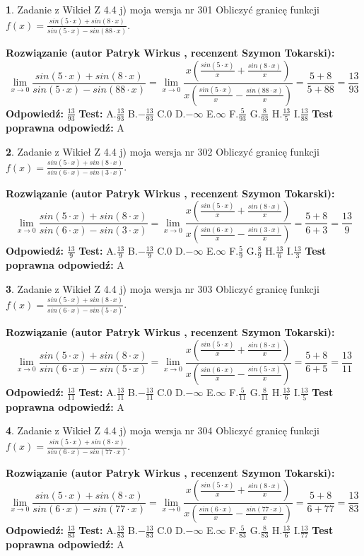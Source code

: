 \documentclass[12pt, a4paper]{article}
\theoremstyle{definition} %
\newtheorem{zad}{}
\newcommand{\zadStart}[1]{\begin{zad}#1\newline}
\newcommand{\zadStop}{\end{zad}}
\newcommand{\rozwStart}[2]{\noindent \textbf{Rozwiązanie (autor #1 , recenzent #2): }\newline}
\newcommand{\rozwStop}{\newline}
\newcommand{\odpStart}{\noindent \textbf{Odpowiedź:}\newline}
\newcommand{\odpStop}{\newline}
\newcommand{\testStart}{\noindent \textbf{Test:}\newline}
\newcommand{\testStop}{\newline}
\newcommand{\kluczStart}{\noindent \textbf{Test poprawna odpowiedź:}\newline}
\newcommand{\kluczStop}{\newline}
\begin{document}
\zadStart{Zadanie z Wikieł Z 4.4 j) moja wersja nr 301}
Obliczyć granicę funkcji $f(x)=\frac{sin(5\cdot x) +sin(8\cdot x)}{sin(5\cdot x) -sin(88\cdot x)}$.
\zadStop
\rozwStart{Patryk Wirkus}{Szymon Tokarski}
$$\lim\limits_{x\to 0}\frac{sin(5\cdot x) +sin(8\cdot x)}{sin(5\cdot x) -sin(88\cdot x)}=\lim\limits_{x\to 0}\frac{x(\frac{sin(5\cdot x)}{x}+\frac{sin(8\cdot x)}{x})}{x(\frac{sin(5\cdot x)}{x}-\frac{sin(88\cdot x)}{x})}=\frac{5+8}{5+88} = \frac{13}{93}$$
\rozwStop
\odpStart
$\frac{13}{93}$
\odpStop
\testStart
A.$\frac{13}{93}$
B.$-\frac{13}{93}$
C.$0$
D.$-\infty$
E.$\infty$
F.$\frac{5}{93}$
G.$\frac{8}{93}$
H.$\frac{13}{5}$
I.$\frac{13}{88}$
\testStop
\kluczStart
A
\kluczStop



\zadStart{Zadanie z Wikieł Z 4.4 j) moja wersja nr 302}
Obliczyć granicę funkcji $f(x)=\frac{sin(5\cdot x) +sin(8\cdot x)}{sin(6\cdot x) -sin(3\cdot x)}$.
\zadStop
\rozwStart{Patryk Wirkus}{Szymon Tokarski}
$$\lim\limits_{x\to 0}\frac{sin(5\cdot x) +sin(8\cdot x)}{sin(6\cdot x) -sin(3\cdot x)}=\lim\limits_{x\to 0}\frac{x(\frac{sin(5\cdot x)}{x}+\frac{sin(8\cdot x)}{x})}{x(\frac{sin(6\cdot x)}{x}-\frac{sin(3\cdot x)}{x})}=\frac{5+8}{6+3} = \frac{13}{9}$$
\rozwStop
\odpStart
$\frac{13}{9}$
\odpStop
\testStart
A.$\frac{13}{9}$
B.$-\frac{13}{9}$
C.$0$
D.$-\infty$
E.$\infty$
F.$\frac{5}{9}$
G.$\frac{8}{9}$
H.$\frac{13}{6}$
I.$\frac{13}{3}$
\testStop
\kluczStart
A
\kluczStop



\zadStart{Zadanie z Wikieł Z 4.4 j) moja wersja nr 303}
Obliczyć granicę funkcji $f(x)=\frac{sin(5\cdot x) +sin(8\cdot x)}{sin(6\cdot x) -sin(5\cdot x)}$.
\zadStop
\rozwStart{Patryk Wirkus}{Szymon Tokarski}
$$\lim\limits_{x\to 0}\frac{sin(5\cdot x) +sin(8\cdot x)}{sin(6\cdot x) -sin(5\cdot x)}=\lim\limits_{x\to 0}\frac{x(\frac{sin(5\cdot x)}{x}+\frac{sin(8\cdot x)}{x})}{x(\frac{sin(6\cdot x)}{x}-\frac{sin(5\cdot x)}{x})}=\frac{5+8}{6+5} = \frac{13}{11}$$
\rozwStop
\odpStart
$\frac{13}{11}$
\odpStop
\testStart
A.$\frac{13}{11}$
B.$-\frac{13}{11}$
C.$0$
D.$-\infty$
E.$\infty$
F.$\frac{5}{11}$
G.$\frac{8}{11}$
H.$\frac{13}{6}$
I.$\frac{13}{5}$
\testStop
\kluczStart
A
\kluczStop



\zadStart{Zadanie z Wikieł Z 4.4 j) moja wersja nr 304}
Obliczyć granicę funkcji $f(x)=\frac{sin(5\cdot x) +sin(8\cdot x)}{sin(6\cdot x) -sin(77\cdot x)}$.
\zadStop
\rozwStart{Patryk Wirkus}{Szymon Tokarski}
$$\lim\limits_{x\to 0}\frac{sin(5\cdot x) +sin(8\cdot x)}{sin(6\cdot x) -sin(77\cdot x)}=\lim\limits_{x\to 0}\frac{x(\frac{sin(5\cdot x)}{x}+\frac{sin(8\cdot x)}{x})}{x(\frac{sin(6\cdot x)}{x}-\frac{sin(77\cdot x)}{x})}=\frac{5+8}{6+77} = \frac{13}{83}$$
\rozwStop
\odpStart
$\frac{13}{83}$
\odpStop
\testStart
A.$\frac{13}{83}$
B.$-\frac{13}{83}$
C.$0$
D.$-\infty$
E.$\infty$
F.$\frac{5}{83}$
G.$\frac{8}{83}$
H.$\frac{13}{6}$
I.$\frac{13}{77}$
\testStop
\kluczStart
A
\kluczStop
\end{document}
